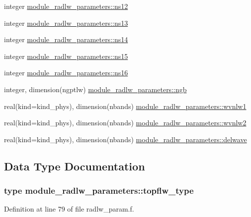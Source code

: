 \begin{DoxyCompactItemize}
integer \hyperlink{group__module__radlw__main_gaabdc77471aadc2932eb213f3b7ecb66c}{module\+\_\+radlw\+\_\+parameters\+::ns12}
\item 
integer \hyperlink{group__module__radlw__main_ga239c74495526cdf72b28e1f5c1d0318e}{module\+\_\+radlw\+\_\+parameters\+::ns13}
\item 
integer \hyperlink{group__module__radlw__main_ga1d49c23da2ed69069a97f861a28a531e}{module\+\_\+radlw\+\_\+parameters\+::ns14}
\item 
integer \hyperlink{group__module__radlw__main_ga9662e6bd344b1dbbfa7cc4429753bb10}{module\+\_\+radlw\+\_\+parameters\+::ns15}
\item 
integer \hyperlink{group__module__radlw__main_ga3a7ba0b8f35271e7979deea86f834479}{module\+\_\+radlw\+\_\+parameters\+::ns16}
\item 
integer, dimension(ngptlw) \hyperlink{group__module__radlw__main_ga2c571bd14c9b7982a7968976858c7547}{module\+\_\+radlw\+\_\+parameters\+::ngb}
\item 
real(kind=kind\+\_\+phys), dimension(nbands) \hyperlink{group__module__radlw__main_ga3a7370a94889d0cbaf6057404830d978}{module\+\_\+radlw\+\_\+parameters\+::wvnlw1}
\item 
real(kind=kind\+\_\+phys), dimension(nbands) \hyperlink{group__module__radlw__main_gace30abd03d144096ee6b444b46081b58}{module\+\_\+radlw\+\_\+parameters\+::wvnlw2}
\item 
real(kind=kind\+\_\+phys), dimension(nbands) \hyperlink{group__module__radlw__main_ga6ad1dff8ffc039d03c5cf3059344308e}{module\+\_\+radlw\+\_\+parameters\+::delwave}
\end{DoxyCompactItemize}


\subsection{Data Type Documentation}
\label{structmodule__radlw__parameters_1_1topflw__type}
\hypertarget{namespacemodule__radlw__parameters_structmodule__radlw__parameters_1_1topflw__type}{}
\subsubsection{type module\+\_\+radlw\+\_\+parameters\+:\+:topflw\+\_\+type}


Definition at line 79 of file radlw\+\_\+param.\+f.



